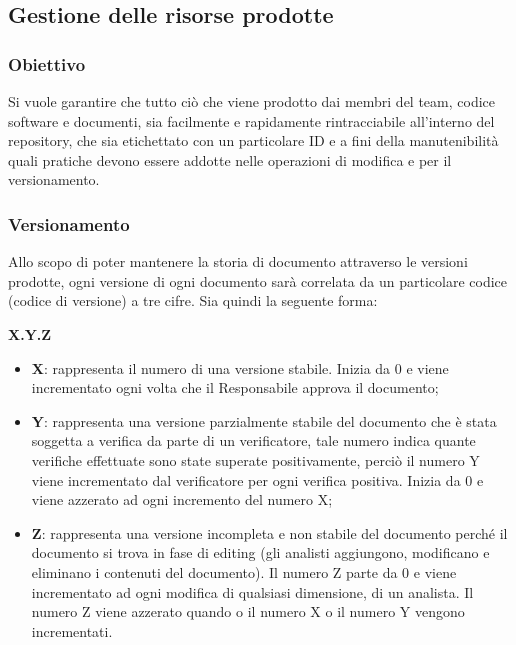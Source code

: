 \subsection{Gestione delle risorse prodotte}
\subsubsection{Obiettivo}

Si vuole garantire che tutto ciò che viene prodotto dai membri del team, codice software e documenti, sia facilmente e rapidamente rintracciabile all’interno del repository, che sia etichettato con un particolare ID e a fini della manutenibilità quali pratiche devono essere addotte nelle operazioni di modifica e per il versionamento.

\subsubsection{Versionamento}
Allo scopo di poter mantenere la storia di documento attraverso le versioni prodotte, ogni versione di ogni documento sarà correlata da un particolare codice (codice di versione) a tre cifre. Sia quindi la seguente forma:
\begin{center}
	\textbf{X.Y.Z}
\end{center}
\begin{itemize}
\item \textbf{X}: rappresenta il numero di una versione stabile. Inizia da 0 e viene incrementato ogni volta che il Responsabile approva il documento;
\item \textbf{Y}: rappresenta una versione parzialmente stabile del documento che è stata soggetta a verifica da parte di un verificatore, tale numero indica quante verifiche effettuate sono state superate positivamente, perciò il numero Y viene incrementato dal verificatore per ogni verifica positiva. Inizia da 0 e viene azzerato ad ogni incremento del numero X;
\item \textbf{Z}: rappresenta una versione incompleta e non stabile del documento perché il documento si trova in fase di editing (gli analisti aggiungono, modificano e eliminano i contenuti del documento). Il numero Z parte da 0 e viene incrementato ad ogni modifica di qualsiasi dimensione, di un analista. Il numero Z viene azzerato quando o il numero X o il numero Y vengono incrementati.
\end{itemize}

